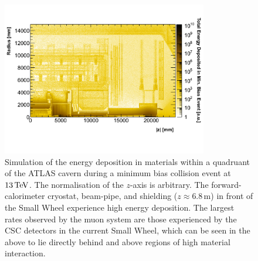 \begin{figure}[!htb]
    \begin{center}
        \includegraphics[width=0.8\textwidth]{figures/nsw/atlas_cavern_bkgPDF}
        \caption{
            Simulation of the energy deposition in materials within a quadruant of the ATLAS cavern
            during a minimum bias collision event at $13\,\text{Te\kern -0.1em V}$.
            The normalisation of the $z$-axis is arbitrary.
            The forward-calorimeter cryostat, beam-pipe, and shielding ($z\approx 6.8$\,m)
            in front of the Small Wheel experience high energy deposition.
            The largest rates observed by the muon system are those experienced
            by the CSC detectors in the current Small Wheel, which can be seen in the above
            to lie directly behind and above regions of high material interaction.
        }
        \label{fig:cavern_bkg}
    \end{center}
\end{figure}

